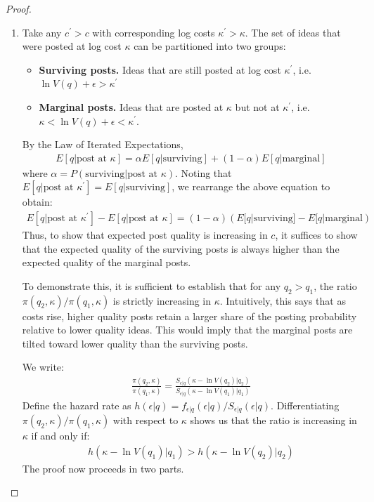 \begin{proof}
\begin{enumerate}[label=(\roman*)]
\item Take any $c^\prime > c$ with corresponding log costs $\kappa^\prime > \kappa$. The set of ideas that were posted at log cost $\kappa$ can be partitioned into two groups:
\begin{itemize}
\item \textbf{Surviving posts.} Ideas that are still posted at log cost $\kappa^\prime$, i.e. $\ln V(q) + \epsilon > \kappa^\prime$
\item \textbf{Marginal posts.} Ideas that are posted at $\kappa$ but not at $\kappa^\prime$, i.e. $\kappa < \ln V(q) + \epsilon < \kappa^\prime$.
\end{itemize}
By the Law of Iterated Expectations,
\begin{align*}
E[q | \text{post at } \kappa] = \alpha E[q | \text{surviving}] + (1-\alpha) E[q | \text{marginal}]
\end{align*}
where $\alpha = P(\text{surviving} | \text{post at } \kappa)$. Noting that $E[q|\text{post at } \kappa^\prime] = E[q|\text{surviving}]$, we rearrange the above equation to obtain:
\begin{align*}
E[q|\text{post at } \kappa^\prime] - E[q|\text{post at } \kappa] = (1-\alpha) \left( E[q|\text{surviving}] - E[q|\text{marginal}\right)
\end{align*}
Thus, to show that expected post quality is increasing in $c$, it suffices to show that the expected quality of the surviving posts is always higher than the expected quality of the marginal posts. 

To demonstrate this, it is sufficient to establish that for any $q_2 > q_1$, the ratio $\pi(q_2,\kappa)/\pi(q_1,\kappa)$ is strictly increasing in $\kappa$. Intuitively, this says that as costs rise, higher quality posts retain a larger share of the posting probability relative to lower quality ideas. This would imply that the marginal posts are tilted toward lower quality than the surviving posts.

We write:
\begin{align*}
\frac{\pi(q_2,\kappa)}{\pi(q_1,\kappa)} = \frac{S_{\epsilon|q}(\kappa-\ln V(q_2)|q_2)}{S_{\epsilon|q}(\kappa - \ln V(q_1)|q_1)} \label{eq_prob_ratio}
\end{align*}
Define the hazard rate as $h(\epsilon|q) = f_{\epsilon|q}(\epsilon|q) / S_{\epsilon|q}(\epsilon|q)$. Differentiating $\pi(q_2,\kappa)/\pi(q_1,\kappa)$ with respect to $\kappa$ shows us that the ratio is increasing in $\kappa$ if and only if:
\begin{align*}
h(\kappa - \ln V(q_1) | q_1) > h(\kappa - \ln V(q_2) | q_2)
\end{align*}
The proof now proceeds in two parts. 


\end{enumerate}
\end{proof}
